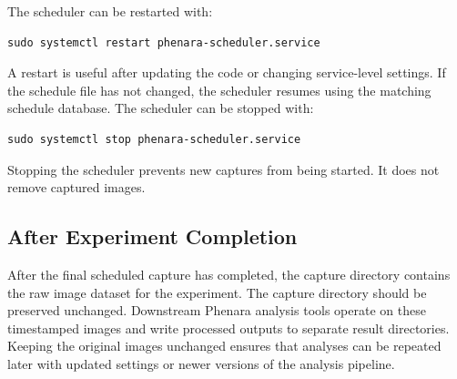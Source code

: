 The scheduler can be restarted with:

\begin{verbatim}
sudo systemctl restart phenara-scheduler.service
\end{verbatim}

A restart is useful after updating the code or changing service-level settings.
If the schedule file has not changed, the scheduler resumes using the matching
schedule database. The scheduler can be stopped with:

\begin{verbatim}
sudo systemctl stop phenara-scheduler.service
\end{verbatim}

Stopping the scheduler prevents new captures from being started. It does not
remove captured images.

\subsection{After Experiment Completion}

After the final scheduled capture has completed, the capture directory contains
the raw image dataset for the experiment. The capture directory should be
preserved unchanged. Downstream Phenara analysis tools operate on these
timestamped images and write processed outputs to separate result directories.
Keeping the original images unchanged ensures that analyses can be repeated
later with updated settings or newer versions of the analysis pipeline.
